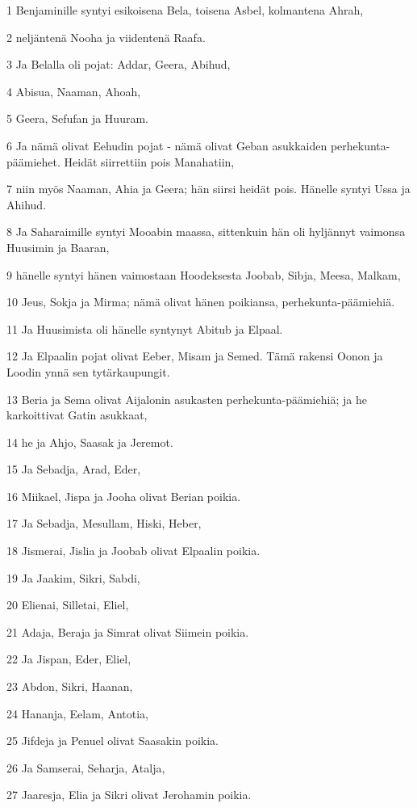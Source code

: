 \par 1 Benjaminille syntyi esikoisena Bela, toisena Asbel, kolmantena Ahrah,
\par 2 neljäntenä Nooha ja viidentenä Raafa.
\par 3 Ja Belalla oli pojat: Addar, Geera, Abihud,
\par 4 Abisua, Naaman, Ahoah,
\par 5 Geera, Sefufan ja Huuram.
\par 6 Ja nämä olivat Eehudin pojat - nämä olivat Geban asukkaiden perhekunta-päämiehet. Heidät siirrettiin pois Manahatiin,
\par 7 niin myös Naaman, Ahia ja Geera; hän siirsi heidät pois. Hänelle syntyi Ussa ja Ahihud.
\par 8 Ja Saharaimille syntyi Mooabin maassa, sittenkuin hän oli hyljännyt vaimonsa Huusimin ja Baaran,
\par 9 hänelle syntyi hänen vaimostaan Hoodeksesta Joobab, Sibja, Meesa, Malkam,
\par 10 Jeus, Sokja ja Mirma; nämä olivat hänen poikiansa, perhekunta-päämiehiä.
\par 11 Ja Huusimista oli hänelle syntynyt Abitub ja Elpaal.
\par 12 Ja Elpaalin pojat olivat Eeber, Misam ja Semed. Tämä rakensi Oonon ja Loodin ynnä sen tytärkaupungit.
\par 13 Beria ja Sema olivat Aijalonin asukasten perhekunta-päämiehiä; ja he karkoittivat Gatin asukkaat,
\par 14 he ja Ahjo, Saasak ja Jeremot.
\par 15 Ja Sebadja, Arad, Eder,
\par 16 Miikael, Jispa ja Jooha olivat Berian poikia.
\par 17 Ja Sebadja, Mesullam, Hiski, Heber,
\par 18 Jismerai, Jislia ja Joobab olivat Elpaalin poikia.
\par 19 Ja Jaakim, Sikri, Sabdi,
\par 20 Elienai, Silletai, Eliel,
\par 21 Adaja, Beraja ja Simrat olivat Siimein poikia.
\par 22 Ja Jispan, Eder, Eliel,
\par 23 Abdon, Sikri, Haanan,
\par 24 Hananja, Eelam, Antotia,
\par 25 Jifdeja ja Penuel olivat Saasakin poikia.
\par 26 Ja Samserai, Seharja, Atalja,
\par 27 Jaaresja, Elia ja Sikri olivat Jerohamin poikia.
